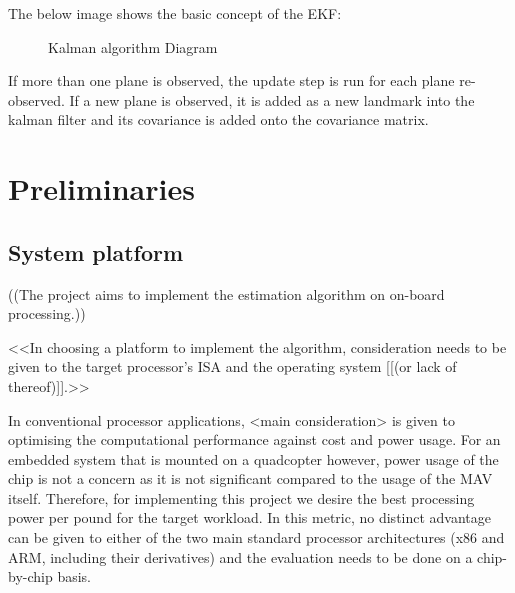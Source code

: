\documentclass[]{article}
\begin{document}
{The below image shows the basic concept of the EKF:
\begin{figure}[H]
\centering     %
{} \;
\caption{Kalman algorithm Diagram}
\end{figure}

If more than one plane is observed, the update step is run for each plane re-observed. If a new plane is observed, it is added as a new landmark into the kalman filter and its covariance is added onto the covariance matrix.

\section{Preliminaries}

\subsection{System platform} %
\label{sub:system_platform}

((The project aims to implement the estimation algorithm on on-board processing.))

<<In choosing a platform to implement the algorithm, consideration needs to be given to the target processor's ISA and the operating system [[(or lack of thereof)]].>>

In conventional processor applications, <main consideration> is given to optimising the computational performance against cost and power usage. For an embedded system that is mounted on a quadcopter however, power usage of the chip is not a concern as it is not significant compared to the usage of the MAV itself. Therefore, for implementing this project we desire the best processing power per pound for the target workload. In this metric, no distinct advantage can be given to either of the two main standard processor architectures (x86 and ARM, including their derivatives) and the evaluation needs to be done on a chip-by-chip basis. 

}
\end{document}

